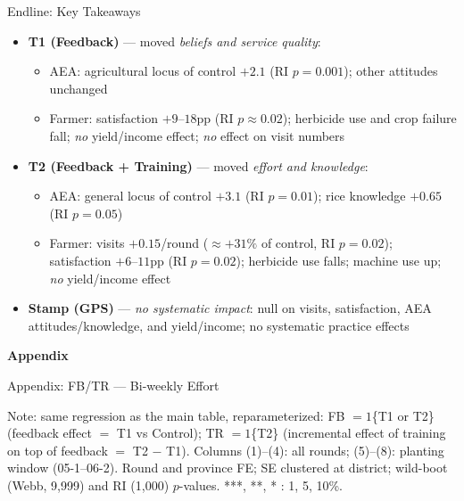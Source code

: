 \documentclass[aspectratio=169]{beamer}
\begin{document}
\begin{frame}{Endline: Key Takeaways}
\begin{itemize}\small
	\item \textbf{T1 (Feedback)} --- moved \emph{beliefs and service quality}:
	\begin{itemize}\small
		\item AEA: agricultural locus of control $+2.1$ (RI $p=0.001$); other attitudes unchanged
		\item Farmer: satisfaction $+9$--$18$pp (RI $p\approx0.02$); herbicide use and
		      crop failure fall; \emph{no} yield/income effect; \emph{no} effect on visit numbers
	\end{itemize}
	\item \textbf{T2 (Feedback + Training)} --- moved \emph{effort and knowledge}:
	\begin{itemize}\small
		\item AEA: general locus of control $+3.1$ (RI $p=0.01$); rice knowledge $+0.65$ (RI $p=0.05$)
		\item Farmer: visits $+0.15$/round ($\approx+31\%$ of control, RI $p=0.02$); satisfaction
		      $+6$--$11$pp (RI $p=0.02$); herbicide use falls; machine use up;
		      \emph{no} yield/income effect
	\end{itemize}
	\item \textbf{Stamp (GPS)} --- \emph{no systematic impact}: null on visits, satisfaction,
	      AEA attitudes/knowledge, and yield/income; no systematic practice effects
\end{itemize}
\end{frame}

\appendix
\begin{frame}[plain]
	\vfill
	\centering
	{\Huge\bfseries\textcolor{myGreen}{Appendix}}
	\vfill
\end{frame}

\begin{frame}{Appendix: FB/TR --- Bi-weekly Effort}
	\centering
	\scalebox{0.5}{}
	\begin{tablenotes}
		\scriptsize
		\item Note: same regression as the main table, reparameterized: FB $=1$\{T1 or T2\}
		(feedback effect $=$ T1 vs Control); TR $=1$\{T2\} (incremental effect of training on top
		of feedback $=$ T2 $-$ T1). Columns (1)--(4): all rounds; (5)--(8): planting window
		(05-1--06-2). Round and province FE; SE clustered at district; wild-boot (Webb, 9{,}999)
		and RI (1{,}000) $p$-values. ***, **, * : 1, 5, 10\%.
	\end{tablenotes}
\end{frame}
\end{document}
